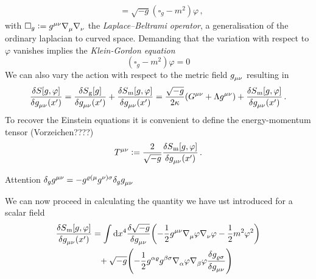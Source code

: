 \begin{example}
\begin{equation}
\begin{split}
&=\sqrt{-g}\left(\square_{g}-m^2\right)\varphi\, ,
\end{split}
\end{equation}
with $\square_{g}:=\tensor{g}{^\mu^\nu}
\tensor{\nabla}{_\mu}\tensor{\nabla}{_\nu} $ the
\emph{Laplace–Beltrami operator}, a generalisation of the ordinary laplacian to
curved space.
Demanding that the variation with respect to $\varphi$ vanishes implies the
\emph{Klein-Gordon equation}
\begin{equation}
\left(\square_g-m^2\right)\varphi=0
\end{equation}
We can also vary the action with respect to the metric
field $\tensor{g}{_\mu_\nu}$ resulting in 
\begin{equation}
\frac{\delta S[g,\varphi]}{\delta
\tensor{g}{_\mu_\nu}\left(x'\right)}=
\frac{\delta S\textsubscript{g}[g]}{\delta
\tensor{g}{_\mu_\nu}\left(x'\right)}
+\frac{\delta S\textsubscript{m}[g,\varphi]}{\delta
\tensor{g}{_\mu_\nu}\left(x'\right)}
=\frac{\sqrt{-g}}{2\kappa}\left(\tensor{G}{^\mu^\nu}+\Lambda\tensor{g}{^\mu^\nu}
\right)+\frac{\delta S\textsubscript{m}[g,\varphi]}{\delta
\tensor{g}{_\mu_\nu}\left(x'\right)}\,.
\end{equation}
To recover the Einstein equations it is convenient to define the
energy-momentum tensor (Vorzeichen????)
\begin{equation}
\tensor{T}{^\mu^\nu}:=\frac{2}{\sqrt{-g}}\frac{\delta
S\textsubscript{m}[g,\varphi]}{\delta \tensor{g}{_\mu_\nu}\left(x'\right)}\,.
\end{equation}
\begin{remark}
Attention $\delta_g
\tensor{g}{^\mu^\nu}=-\tensor{g}{^\varrho^{(\mu}}\tensor{g}{^{\nu)}^\sigma}\delta_g
\tensor{g}{_\mu_\nu}$
\end{remark}
We can now proceed in calculating the quantity we have ust introduced for a
scalar field
\begin{equation}
\begin{split}
\frac{\delta
S\textsubscript{m}[g,\varphi]}{\delta \tensor{g}{_\mu_\nu}\left(x'\right)}
&=\int \dif x^4 \frac{\delta\sqrt{-g}}{\delta
\tensor{g}{_\mu_\nu}}\left(-\frac{1}{2}\tensor{g}{^\mu^\nu}
\tensor{\nabla}{_\mu}\varphi\tensor{\nabla}{_\nu}\varphi-\frac{1}{2}m^2\varphi^2\right)\\
&\phantom{=}+
\sqrt{-g}\left(-\frac{1}{2}\tensor{g}{^\alpha^\varrho}\tensor{g}{^\beta^\sigma} \tensor{\nabla}{_\alpha}\varphi\tensor{\nabla}{_\beta}\varphi\frac{\delta
\tensor{g}{_\varrho_\sigma}}{\delta \tensor{g}{_\mu_\nu}}\right)\\

\end{split}
\end{equation}
\end{example}

